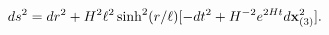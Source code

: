 \begin{equation}
ds^{2}=dr^{2}+H^2\ell^2\sinh^2(r/\ell)
[-dt^{2}+H^{-2} e^{2Ht} d{\bf x}_{(3)}^{2}].
\label{metric}
\end{equation}

